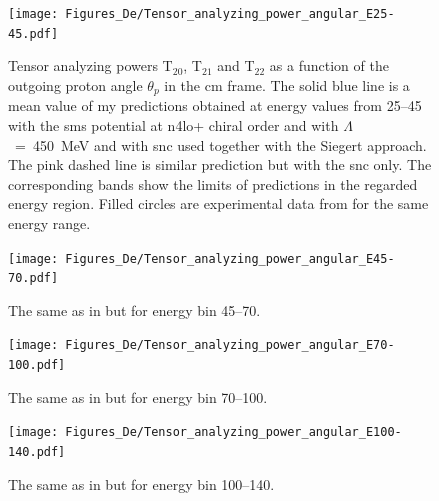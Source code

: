     \begin{figure}[h]
        \begin{center}
        \texttt{[image: Figures\_De/Tensor\_analyzing\_power\_angular\_E25-45.pdf]}
        \end{center}
        \caption{Tensor analyzing powers T$_{20}$, T$_{21}$ and T$_{22}$ as a function of the
        outgoing proton angle $\theta_p$ in the \gls{cm} frame.
        The solid blue line is a mean value of my predictions obtained 
        at energy values from \SIrange[range-phrase=\text{ to }]{25}{45}{\mev} with the
        \gls{sms} potential at \gls{n4lo+} chiral order and with $\Lambda$~=~450~MeV
         and with \gls{snc} used together with the Siegert approach. 
        The pink dashed line is similar prediction but with the \gls{snc} only. 
        The corresponding bands show the limits of predictions in the regarded
        energy region.
        Filled circles are experimental data
        from \cite{rachek2007} for the same energy range.}
        \label{tensor_angular_25-45}
    \end{figure}

    \begin{figure}[h]
        \begin{center}
        \texttt{[image: Figures\_De/Tensor\_analyzing\_power\_angular\_E45-70.pdf]}
        \end{center}
        \caption{The same as in  but for energy bin \SIrange{45}{70}{\mev}.}
        \label{tensor_angular_45-70}
    \end{figure}

    \begin{figure}[h]
        \begin{center}
        \texttt{[image: Figures\_De/Tensor\_analyzing\_power\_angular\_E70-100.pdf]}
        \end{center}
        \caption{The same as in  but for energy bin \SIrange{70}{100}{\mev}.}
        \label{tensor_angular_70-100}
    \end{figure}        

    \begin{figure}[h]
        \begin{center}
        \texttt{[image: Figures\_De/Tensor\_analyzing\_power\_angular\_E100-140.pdf]}
        \end{center}
        \caption{The same as in  but for energy bin \SIrange{100}{140}{\mev}.}
        \label{tensor_angular_100-140}
    \end{figure}
        
